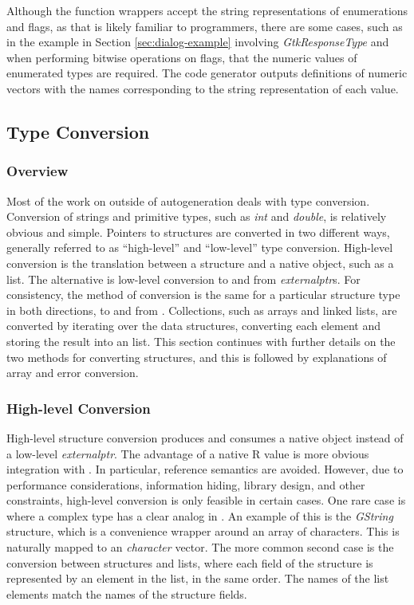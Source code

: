 \documentclass[article]{jss}
\begin{document}
Although the function wrappers accept the string representations of
enumerations 
and flags, as that is likely familiar to  programmers,
there are
some cases, such as in the example in Section \ref{sec:dialog-example}
involving 
\emph{GtkResponseType} and when performing bitwise operations on
flags, that the
numeric values of enumerated types are required. The code generator
outputs 
definitions of  numeric vectors with the names
corresponding to the
string representation of each value.

\subsection{Type Conversion}

\subsubsection{Overview}

Most of the work on  outside of autogeneration deals with
type 
conversion. Conversion of strings and primitive  types,
such as \emph{int} and 
\emph{double}, is relatively obvious and simple. Pointers to
 structures are converted
in two different ways, generally referred to as ``high-level''
and ``low-level'' type conversion. High-level conversion is the
translation
between a  structure and a native  object,
such as a list. 
The alternative is low-level conversion to and from
 \emph{externalptr}s. For consistency, the method of
conversion is 
the same for a particular structure type in both directions, to and
from .
Collections, such as arrays and linked 
lists, are converted by iterating over the data structures, converting
each
element and storing the result into an  list. This section
continues
with further details on the two methods for converting 
structures, and this is followed by explanations of array and error
conversion.

\subsubsection[High-level Conversion]{High-level
Conversion}\label{sec:high-level-conversion}

High-level structure conversion produces and consumes a native
 object instead of a low-level \emph{externalptr}. The
advantage of a native R value is more obvious integration with
. In particular, reference semantics are avoided.
However, due to performance considerations, information hiding,
library design, and other constraints, high-level conversion is only
feasible in certain cases.  One rare case is where a complex
 type has a clear analog in .  An example of
this is the \emph{GString} structure, which is a convenience wrapper
around an array of characters. This is naturally mapped to an
 \emph{character} vector. The more common second case is
the conversion between  structures and  lists,
where each field of the structure is represented by an element in the
list, in the same order. The names of the list elements match the
names of the structure fields.
\end{document}
